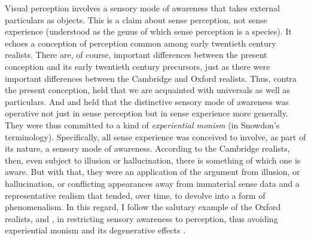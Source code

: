 \documentclass[12pt]{article}
\begin{document}
Visual perception involves a sensory mode of awareness that takes external particulars as objects. This is a claim about sense perception, not sense experience (understood as the genus of which sense perception is a species). It echoes a conception of perception common among early twentieth century realists. There are, of course, important differences between the present conception and its early twentieth century precursors, just as there were important differences between the Cambridge and Oxford realists. Thus, contra the present conception, \citet[]{Russell:1912uq} held that we are acquainted with universals as well as particulars. And \citet[]{Russell:1912uq} and \citet[]{Price:1932fk} held that the distinctive sensory mode of awareness was operative not just in sense perception but in sense experience more generally. They were thus committed to a kind of \emph{experiential monism} (in Snowdon's \citeyear{Snowdon:2008oz} terminology). Specifically, all sense experience was conceived to involve, as part of its nature, a sensory mode of awareness. According to the Cambridge realists, then, even subject to illusion or hallucination, there is something of which one is aware. But with that, they were an application of the argument from illusion, or hallucination, or conflicting appearances away from immaterial sense data and a representative realism that tended, over time, to devolve into a form of phenomenalism. In this regard, I follow the salutary example of the Oxford realists, \citet{Cook-Wilson:1926sf} and \citet[]{Prichard:1906gf,Prichard:1909yg}, in restricting sensory awareness to perception, thus avoiding experiential monism and its degenerative effects \citep[see][]{Marion:2000kl,Marion:2000ai,Kalderon:2010fk}.
\end{document}
